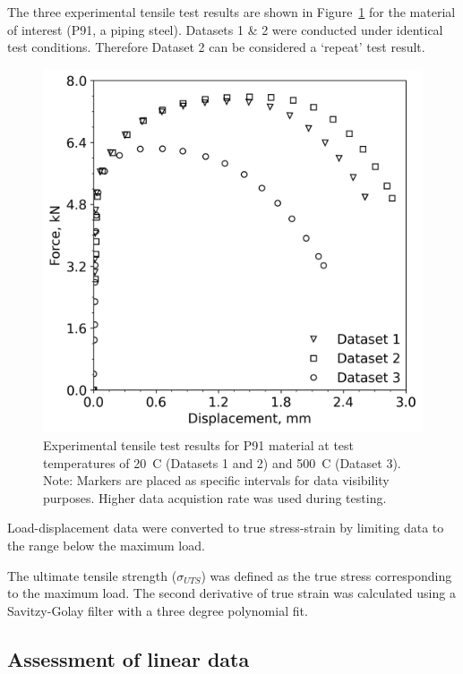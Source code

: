 \documentclass[preprint, review, 12pt]{elsarticle}
\begin{document}
	The three experimental tensile test results are shown in Figure~\ref{fig:exp_test_results} for the material of interest (P91, a piping steel).
	Datasets 1 \& 2 were conducted under identical test conditions.
	Therefore Dataset 2 can be considered a `repeat' test result.
	\begin{figure}[!htbp]
		\centering
		\includegraphics[width=\linewidth, height=0.4\textheight, keepaspectratio]{EXPERIMENTAL_RESULTS}
		\caption{Experimental tensile test results for P91 material at test temperatures of 20~\degree C (Datasets 1 and 2) and 500~\degree C (Dataset 3). Note: Markers are placed as specific intervals for data visibility purposes. Higher data acquistion rate was used during testing.}
		\label{fig:exp_test_results}
	\end{figure}
	Load-displacement data were converted to true stress-strain by limiting data to the range below the maximum load.



	The ultimate tensile strength ($\sigma_{UTS}$) was defined as the true stress corresponding to the maximum load.
	The second derivative of true strain was calculated using a Savitzy-Golay filter with a three degree polynomial fit.

	\subsection{Assessment of linear data}
	\label{h:linear_region}
\end{document}
